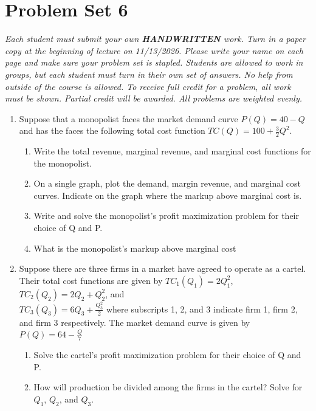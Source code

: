 \documentclass[11pt]{article}
\begin{document}
  
\section*{Problem Set 6}

\emph{Each student must submit your own \textbf{HANDWRITTEN} work. Turn in a paper copy at the beginning of lecture on 11/13/2026.  Please write your name on each page and make sure your problem set is stapled.  Students are allowed to work in groups, but each student must turn in their own set of answers.  No help from outside of the course is allowed.  To receive full credit for a problem, all work must be shown.  Partial credit will be awarded.  All problems are weighted evenly.}

\begin{enumerate}
  \item Suppose that a monopolist faces the market demand curve $P(Q) = 40 - Q$ and has the faces the following total cost function $TC(Q) = 100 + \frac{3}{2}Q^{2}$.
  \begin{enumerate}
  	\item Write the total revenue, marginal revenue, and marginal cost functions for the monopolist.
     \vspace*{25mm}  	
    \item On a single graph, plot the demand, margin revenue, and marginal cost curves.  Indicate on the graph where the markup above marginal cost is.
     \vspace*{60mm}
     \item Write and solve the monopolist's profit maximization problem for their choice of Q and P.
     \vspace*{50mm}    
     \item What is the monopolist's markup above marginal cost  
     \end{enumerate}
  
  \newpage
  \item Suppose there are three firms in a market have agreed to operate as a cartel.  Their total cost functions are given by $TC_{1}(Q_{1}) = 2Q_{1}^{2}$, $TC_{2}(Q_{2}) = 2Q_{2} + Q_{2}^{2}$, and \\ $TC_{3}(Q_{3}) = 6Q_{3} + \frac{Q_{3}^{2}}{2}$ where subscripts 1, 2, and 3 indicate firm 1, firm 2, and firm 3 respectively. The market demand curve is given by $P(Q) = 64 - \frac{Q}{7} $
  \begin{enumerate}
	\item Solve the cartel's profit maximization problem for their choice of Q and P.
  \vspace*{145mm} 
	\item How will production be divided among the firms in the cartel? Solve for $Q_{1}$, $Q_{2}$, and $Q_{3}$.
  \end{enumerate}
  

\end{enumerate}
\end{document}
